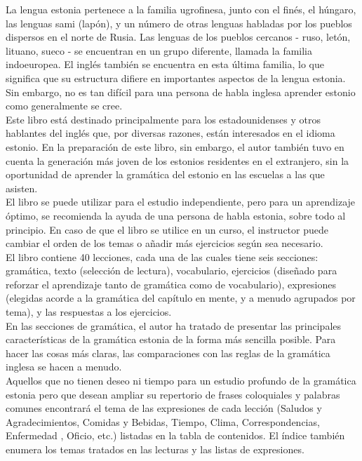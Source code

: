 La lengua estonia pertenece a la familia ugrofinesa, junto con el finés, el húngaro, las lenguas sami (lapón), y un número de otras lenguas habladas por los pueblos dispersos en el norte de Rusia. Las lenguas de los pueblos cercanos - ruso, letón, lituano, sueco - se encuentran en un grupo diferente, llamada la familia indoeuropea. El inglés también se encuentra en esta última familia, lo que significa que su estructura difiere en importantes aspectos de la lengua estonia. Sin embargo, no es tan difícil para una persona de habla inglesa aprender estonio como generalmente se cree.\\

Este libro está destinado principalmente para los estadounidenses y otros hablantes del inglés que, por diversas razones, están interesados en el idioma estonio. En la preparación de este libro, sin embargo, el autor también tuvo en cuenta la generación más joven de los estonios residentes en el extranjero, sin la oportunidad de aprender la gramática del estonio en las escuelas a las que asisten.\\

El libro se puede utilizar para el estudio independiente, pero para un aprendizaje óptimo, se recomienda la ayuda de una persona de habla estonia, sobre todo al principio. En caso de que el libro se utilice en un curso, el instructor puede cambiar el orden de los temas o añadir más ejercicios según sea necesario.\\

El libro contiene 40 lecciones, cada una de las cuales tiene seis secciones: gramática, texto (selección de lectura), vocabulario, ejercicios (diseñado para reforzar el aprendizaje tanto de gramática como de vocabulario), expresiones (elegidas acorde a la gramática del capítulo en mente, y a menudo agrupados por tema), y las respuestas a los ejercicios.\\

En las secciones de gramática, el autor ha tratado de presentar las principales características de la gramática estonia de la forma más sencilla posible. Para hacer las cosas más claras, las comparaciones con las reglas de la gramática inglesa se hacen a menudo.\\

Aquellos que no tienen deseo ni tiempo para un estudio profundo de la gramática estonia pero que desean ampliar su repertorio de frases coloquiales y palabras comunes encontrará el tema de las expresiones de cada lección (Saludos y Agradecimientos, Comidas y Bebidas, Tiempo, Clima, Correspondencias, Enfermedad , Oficio, etc.) listadas en la tabla de contenidos. El índice también enumera los temas tratados en las lecturas y las listas de expresiones.\\

